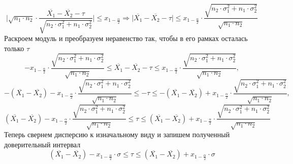 \documentclass[a4paper, 12pt]{article}
\begin{document}
    $$\Bigg|\sqrt{n_1\cdot n_2}\cdot\dfrac{\overline{X_1}-\overline{X_2}-\tau}{\sqrt{n_2\cdot\sigma_1^2+n_1\cdot\sigma_2^2}}\Bigg|\leq x_{1-\frac{\alpha}{2}}\Rightarrow
    \Bigg|\overline{X_1}-\overline{X_2}-\tau\Bigg|\leq x_{1-\frac{\alpha}{2}}\cdot\dfrac{\sqrt{n_2\cdot\sigma_1^2+n_1\cdot\sigma_2^2}}{\sqrt{n_1\cdot n_2}}$$
    Раскроем модуль и преобразуем неравенство так, чтобы в его рамках осталась только $\tau$
    $$-x_{1-\frac{\alpha}{2}}\cdot\dfrac{\sqrt{n_2\cdot\sigma_1^2+n_1\cdot\sigma_2^2}}{\sqrt{n_1\cdot n_2}}\leq\overline{X_1}-\overline{X_2}-\tau\leq x_{1-\frac{\alpha}{2}}\cdot\dfrac{\sqrt{n_2\cdot\sigma_1^2+n_1\cdot\sigma_2^2}}{\sqrt{n_1\cdot n_2}},$$
    $$-\left(\overline{X_1}-\overline{X_2}\right)-x_{1-\frac{\alpha}{2}}\cdot\dfrac{\sqrt{n_2\cdot\sigma_1^2+n_1\cdot\sigma_2^2}}{\sqrt{n_1\cdot n_2}}\leq-\tau\leq -\left(\overline{X_1}-\overline{X_2}\right)+x_{1-\frac{\alpha}{2}}\cdot\dfrac{\sqrt{n_2\cdot\sigma_1^2+n_1\cdot\sigma_2^2}}{\sqrt{n_1\cdot n_2}},$$
    $$\left(\overline{X_1}-\overline{X_2}\right)-x_{1-\frac{\alpha}{2}}\cdot\dfrac{\sqrt{n_2\cdot\sigma_1^2+n_1\cdot\sigma_2^2}}{\sqrt{n_1\cdot n_2}}\leq\tau\leq \left(\overline{X_1}-\overline{X_2}\right)+x_{1-\frac{\alpha}{2}}\cdot\dfrac{\sqrt{n_2\cdot\sigma_1^2+n_1\cdot\sigma_2^2}}{\sqrt{n_1\cdot n_2}}$$
    Теперь свернем дисперсию к изначальному виду и запишем полученный доверительный интервал
    $$\left(\overline{X_1}-\overline{X_2}\right)-x_{1-\frac{\alpha}{2}}\cdot\sigma\leq\tau\leq \left(\overline{X_1}-\overline{X_2}\right)+x_{1-\frac{\alpha}{2}}\cdot\sigma$$
\end{document}
